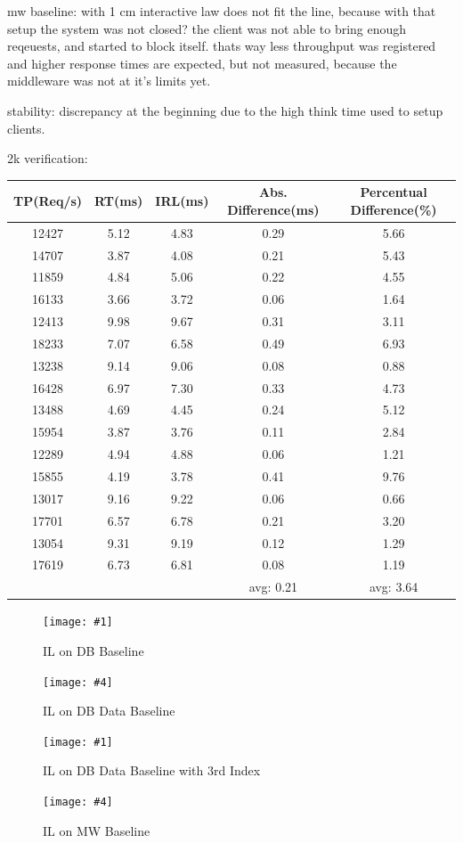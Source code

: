 \documentclass[11pt]{article}
\newcommand\TwoFig[6]{%
	\sbox\IBoxA{\texttt{[image: \#1]}}
	\sbox\IBoxB{\texttt{[image: \#4]}}%
	\ifdim\ht\IBoxA>\ht\IBoxB
	\setlength\IHeight{\ht\IBoxB}\else\setlength\IHeight{\ht\IBoxA}\fi%
	\begin{figure}[!htb]
		\minipage[t]{0.5\textwidth}\centering
		\texttt{[image: \#1]}
		\caption{#2}\label{#3}
		\endminipage \hfill
		\minipage[t]{0.5\textwidth}\centering
		\texttt{[image: \#4]}
		\caption{#5}\label{#6}
		\endminipage
	\end{figure}%
}
\begin{document}
mw baseline: with 1 cm interactive law does not fit the line, because with that setup the system was not closed? the client was not able to bring enough reqeuests, and started to block itself. thats way less throughput was registered and higher response times are expected, but not measured, because the middleware was not at it's limits yet.

stability: discrepancy at the beginning due to the high think time used to setup clients.

2k verification:

\begin{tabular}{c|c|c||c|c}
	TP(Req/s) & RT(ms) & IRL(ms) & Abs. Difference(ms) & Percentual Difference(\%) \\
	\hline
	12427 & 5.12 & 4.83 & 0.29 & 5.66 \\
	14707 & 3.87 & 4.08 & 0.21 & 5.43 \\
	11859 & 4.84 & 5.06 & 0.22 & 4.55 \\
	16133 & 3.66 & 3.72 & 0.06 & 1.64 \\
	12413 & 9.98 & 9.67 & 0.31 & 3.11 \\
	18233 & 7.07 & 6.58 & 0.49 & 6.93 \\
	13238 & 9.14 & 9.06 & 0.08 & 0.88 \\
	16428 & 6.97 & 7.30 & 0.33 & 4.73 \\
	13488 & 4.69 & 4.45 & 0.24 & 5.12 \\
	15954 & 3.87 & 3.76 & 0.11 & 2.84 \\
	12289 & 4.94 & 4.88 & 0.06 & 1.21 \\
	15855 & 4.19 & 3.78 & 0.41 & 9.76 \\
	13017 & 9.16 & 9.22 & 0.06 & 0.66 \\
	17701 & 6.57 & 6.78 & 0.21 & 3.20 \\
	13054 & 9.31 & 9.19 & 0.12 & 1.29 \\
	17619 & 6.73 & 6.81 & 0.08 & 1.19 \\
	\hline  
	&&& avg: 0.21 & avg: 3.64 \\
	\hline  
\end{tabular}

\TwoFig {figures/interactive_law/db_baseline} {IL on DB Baseline} {}
		{figures/interactive_law/db_data_baseline} {IL on DB Data Baseline} {}

\TwoFig {figures/interactive_law/db_data_baseline_third_index} {IL on DB Data Baseline with 3rd Index} {}
		{figures/interactive_law/mw_baseline} {IL on MW Baseline} {}
		
\end{document}
